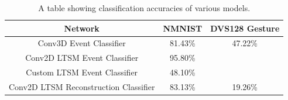\begin{table}[htb]
    \centering
    \begin{tabular}{|| c | c | c ||}
        \hline
        Network     & NMNIST & DVS128 Gesture \\
        \hline \hline
        Conv3D Event Classifier          & 81.43\%   &   \color{red} 47.22\% \color{black}    \\
        \hline
        Conv2D LTSM Event Classifier         & 95.80\%   &        \\
        \hline
        Custom LTSM Event Classifier         & \color{red} 48.10\% \color{black}   &        \\
        \hline
        Conv2D LTSM Reconstruction Classifier           & \color{red} 83.13\% \color{black}    &    \color{red} 19.26\% \color{black}   \\
        \hline
    \end{tabular}
    \caption{A table showing classification accuracies of various models.}
    \label{tab:network_performances}
\end{table}
